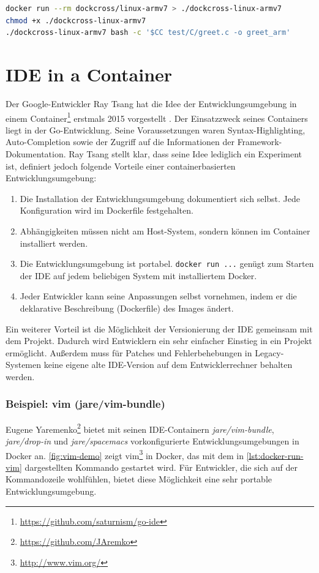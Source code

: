 \begin{lstlisting}[caption=Kommandos zum Übersetzen mit dockcross, language=bash, label=lst:dockercross-arm-greet]
docker run --rm dockcross/linux-armv7 > ./dockcross-linux-armv7
chmod +x ./dockcross-linux-armv7
./dockcross-linux-armv7 bash -c '$CC test/C/greet.c -o greet_arm'
\end{lstlisting}

\section{IDE in a Container}
\label{sec:ideinacontainer}
Der Google-Entwickler Ray Tsang hat die Idee der Entwicklungsumgebung in einem Container\footnote{\url{https://github.com/saturnism/go-ide}} erstmals 2015 vorgestellt \autocite{go-ide-in-a-container:online}.
Der Einsatzzweck seines Containers liegt in der Go-Entwicklung.
Seine Voraussetzungen waren Syntax-Highlighting, Auto-Completion sowie der Zugriff auf die Informationen der Framework-Dokumentation.
Ray Tsang stellt klar, dass seine Idee lediglich ein Experiment ist, definiert jedoch folgende Vorteile einer containerbasierten Entwicklungsumgebung:
\begin{enumerate}
    \item Die Installation der Entwicklungsumgebung dokumentiert sich selbst. Jede Konfiguration wird im Dockerfile festgehalten.
    \item Abhängigkeiten müssen nicht am Host-System, sondern können im Container installiert werden.
    \item Die Entwicklungsumgebung ist portabel. \texttt{docker run ...} genügt zum Starten der IDE auf jedem beliebigen System mit installiertem Docker.
    \item Jeder Entwickler kann seine Anpassungen selbst vornehmen, indem er die deklarative Beschreibung (Dockerfile) des Images ändert.
\end{enumerate}
Ein weiterer Vorteil ist die Möglichkeit der Versionierung der IDE gemeinsam mit dem Projekt.
Dadurch wird Entwicklern ein sehr einfacher Einstieg in ein Projekt ermöglicht.
Außerdem muss für Patches und Fehlerbehebungen in Legacy-Systemen keine eigene alte IDE-Version auf dem Entwicklerrechner behalten werden.

\subsubsection{Beispiel: vim (jare/vim-bundle)}
Eugene Yaremenko\footnote{\url{https://github.com/JAremko}} bietet mit seinen IDE-Containern \emph{jare/vim-bundle}, \emph{jare/drop-in} und \emph{jare/spacemacs} vorkonfigurierte Entwicklungsumgebungen in Docker an.
\cref{fig:vim-demo} zeigt vim\footnote{\url{http://www.vim.org/}} in Docker, das mit dem in \cref{lst:docker-run-vim} dargestellten Kommando gestartet wird.
Für Entwickler, die sich auf der Kommandozeile wohlfühlen, bietet diese Möglichkeit eine sehr portable Entwicklungsumgebung.

